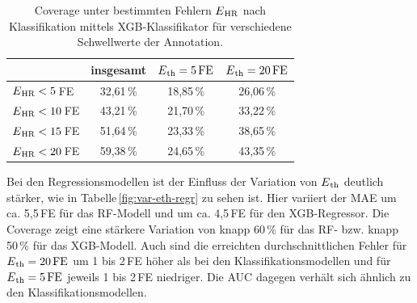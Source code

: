 \begin{table}[H]
	\centering
  	\begin{tabular}{l || c | c | c}
 											& insgesamt 		& $E\textsubscript{th}= 5\text{\,}\si{FE}$ & $E\textsubscript{th}= 20\text{\,}\si{FE}$\\\hline
 		$E\textsubscript{HR} < 5$\,\si{FE} 	&  32{,}61\,\% 	& 18,85\,\% 			& 26,06\,\%\\
 		$E\textsubscript{HR} < 10$\,\si{FE} 	&  43{,}21\,\% 	& 21,70\,\% 			& 33,22\,\%\\
 		$E\textsubscript{HR} < 15$\,\si{FE} 	&  51{,}64\,\% 	& 23,33\,\% 			& 38,65\,\%\\
 		$E\textsubscript{HR} < 20$\,\si{FE} 	&  59{,}38\,\% 	& 24,65\,\% 			& 43,35\,\%\\
 	\end{tabular}
 	\caption{Coverage unter bestimmten Fehlern $E\textsubscript{HR}$ nach Klassifikation mittels \ac{XGB}-Klassifikator für verschiedene Schwellwerte der Annotation.}
 	\label{fig:xgb-clf-cov-eth}
\end{table}

Bei den Regressionsmodellen ist der Einfluss der Variation von $E\textsubscript{th}$ deutlich stärker, wie in Tabelle\,\ref{fig:var-eth-regr} zu sehen ist. Hier variiert der \ac{MAE} um ca. 5,5\,\si{FE} für das \ac{RF}-Modell und um ca. 4,5\,\si{FE} für den \ac{XGB}-Regressor. Die Coverage zeigt eine stärkere Variation von knapp 60\,\% für das \ac{RF}- bzw. knapp 50\,\% für das \ac{XGB}-Modell. Auch sind die erreichten durchschnittlichen Fehler für $E\textsubscript{th}= 20\text{\,}\si{FE}$ um 1 bis 2\,\si{FE} höher als bei den Klassifikationsmodellen und für $E\textsubscript{th}= 5\text{\,}\si{FE}$ jeweils 1 bis 2\,\si{FE} niedriger. Die \ac{AUC} dagegen verhält sich ähnlich zu den Klassifikationsmodellen.

